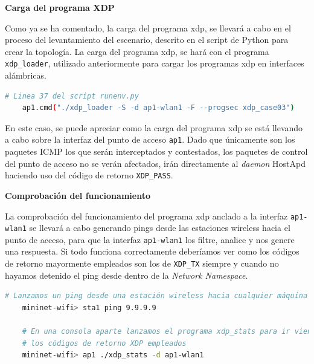\vspace{0.6cm}
\textbf{Carga del programa XDP}\\
\par
Como ya se ha comentado, la carga del programa \gls{xdp}, se llevará a cabo en el proceso del levantamiento del escenario, descrito en el script de Python para crear la topología. La carga del programa \gls{xdp}, se hará con el programa \texttt{xdp\_loader}, utilizado anteriormente para cargar los programas \gls{xdp} en interfaces alámbricas. 

\newpage

\begin{lstlisting}[language= bash, style=Consola, caption={Carga del programa XDP - Case03},label=code:case03_xdp_wifi_load]
    # Linea 37 del script runenv.py
    ap1.cmd("./xdp_loader -S -d ap1-wlan1 -F --progsec xdp_case03")
\end{lstlisting}
\vspace{0.5cm}
En este caso, se puede apreciar como la carga del programa \gls{xdp} se está llevando a cabo sobre la interfaz del punto de acceso \texttt{ap1}. Dado que únicamente son los paquetes ICMP los que serán interceptados y contestados, los paquetes de control del punto de acceso no se verán afectados, irán directamente al \textit{daemon} HostApd haciendo uso del código de retorno \texttt{XDP\_PASS}.\\
\par


\vspace{0.5cm}
\textbf{Comprobación del funcionamiento}\\
\par

La comprobación del funcionamiento del programa \gls{xdp} anclado a la interfaz \texttt{ap1-wlan1} se llevará a cabo generando pings desde las estaciones wireless hacia el punto de acceso, para que la interfaz \texttt{ap1-wlan1} los filtre, analice y nos genere una respuesta. Si todo funciona correctamente deberíamos ver como los códigos de retorno mayormente empleados son los de \texttt{XDP\_TX} siempre y cuando no hayamos detenido el ping desde dentro de la \textit{Network Namespace}. 


\begin{lstlisting}[language= bash, style=Consola, caption={Comprobación del funcionamiento - Case03},label=code:case03_xdp_wifi_func1]
    # Lanzamos un ping desde una estación wireless hacia cualquier máquina
    mininet-wifi> sta1 ping 9.9.9.9
    
    # En una consola aparte lanzamos el programa xdp_stats para ir viendo a tiempo real
    # los códigos de retorno XDP empleados
    mininet-wifi> ap1 ./xdp_stats -d ap1-wlan1
\end{lstlisting}

